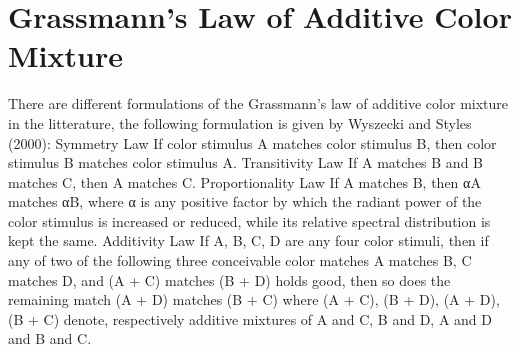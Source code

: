 \section{Grassmann's Law of Additive Color Mixture}%
\label{sec:grassmann-laws-of-additive-color-mixture}

There are different formulations of the Grassmann's law of additive color mixture in the litterature, the following formulation is given by Wyszecki and Styles (2000):
Symmetry Law
If color stimulus A matches color stimulus B, then color stimulus B matches color stimulus A.
Transitivity Law
If A matches B and B matches C, then A matches C.
Proportionality Law
If A matches B, then αA matches αB, where α is any positive factor by which the radiant power of the color stimulus is increased or reduced, while its relative spectral distribution is kept the same.
Additivity Law
If A, B, C, D are any four color stimuli, then if any of two of the following three conceivable color matches A matches B, C matches D, and (A + C) matches (B + D) holds good, then so does the remaining match (A + D) matches (B + C) where (A + C), (B + D), (A + D), (B + C) denote, respectively additive mixtures of A and C, B and D, A and D and B and C.
